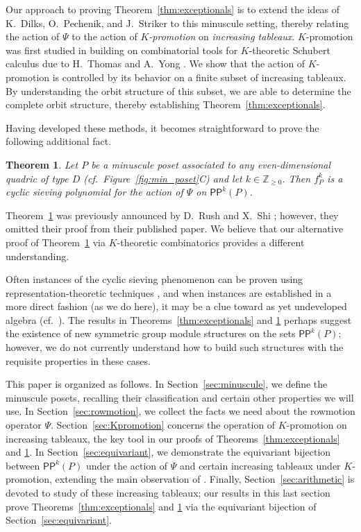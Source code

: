 \documentclass[12pt]{amsart}
\newtheorem{theorem}{Theorem}[section]
\theoremstyle{definition}
\theoremstyle{remark}
\numberwithin{equation}{section}
\newcommand{\pp}{\ensuremath{\mathsf{PP}}}
\begin{document}
Our approach to proving Theorem~\ref{thm:exceptionals} is to extend the ideas of K.~Dilks, O.~Pechenik, and J.~Striker \cite{DPS} to this minuscule setting, thereby relating the action of $\Psi$ to the action of \emph{$K$-promotion} on \emph{increasing tableaux}. $K$-promotion was first studied in \cite{Pechenik} building on combinatorial tools for $K$-theoretic Schubert calculus due to H.~Thomas and A.~Yong \cite{Thomas.Yong:K}. We show that the action of $K$-promotion is controlled by its behavior on a finite subset of increasing tableaux. By understanding the orbit structure of this subset, we are able to determine the complete orbit structure, thereby establishing Theorem~\ref{thm:exceptionals}.

Having developed these methods, it becomes straightforward to prove the following additional fact.
\begin{theorem}\label{thm:propeller}
Let $P$ be a minuscule poset associated to any even-dimensional quadric of type $D$ (cf.~Figure~\ref{fig:min_poset}C) and let $k \in \mathbb{Z}_{\geq 0}$. Then $f_P^k$ is a cyclic sieving polynomial for the action of $\Psi$ on $\pp^k(P)$.
\end{theorem}
Theorem~\ref{thm:propeller} was previously announced by D.~Rush and X.~Shi \cite[Theorem~10.1]{Rush.Shi}; however, they omitted their proof \cite[]{Rush.Shi:report} from their published paper. We believe that our alternative proof of Theorem~\ref{thm:propeller} via $K$-theoretic combinatorics provides a different understanding.

Often instances of the cyclic sieving phenomenon can be proven using representation-theoretic techniques \cite{Reiner.Stanton.White, Rhoades:thesis}, and when instances are established in a more direct fashion (as we do here), it may be a clue toward as yet undeveloped algebra (cf.\ \cite{Rhoades:skein}). The results in Theorems~\ref{thm:exceptionals} and \ref{thm:propeller} perhaps suggest the existence of new symmetric group module structures on the sets $\pp^k(P)$; however, we do not currently understand how to build such structures with the requisite properties in these cases.

This paper is organized as follows. In Section~\ref{sec:minuscule}, we define the minuscule posets, recalling their classification and certain other properties we will use. In Section~\ref{sec:rowmotion}, we collect the facts we need about the rowmotion operator $\Psi$. Section~\ref{sec:Kpromotion} concerns the operation of $K$-promotion on increasing tableaux, the key tool in our proofs of Theorems~\ref{thm:exceptionals} and \ref{thm:propeller}. In Section~\ref{sec:equivariant}, we demonstrate the equivariant bijection between $\pp^k(P)$ under the action of $\Psi$ and certain increasing tableaux under $K$-promotion, extending the main observation of \cite{DPS}.
Finally, Section~\ref{sec:arithmetic} is devoted to study of these increasing tableaux; our results in this last section prove Theorems~\ref{thm:exceptionals} and \ref{thm:propeller} via the equivariant bijection of Section~\ref{sec:equivariant}.
\end{document}
